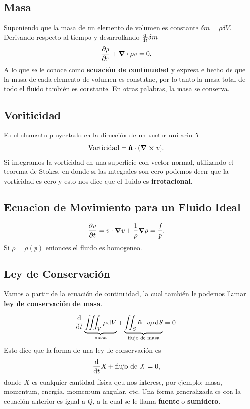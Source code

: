\subsection{Masa}
Suponiendo que la masa de un elemento de volumen es constante $\delta m = \rho \delta V$. Derivando respecto al tiempo y desarrollando $\dv{t} \delta m$
\begin{equation}
	\pdv{\rho}{r} + \div{\rho v} = 0,
\end{equation}
A lo que se le conoce como \textbf{ecuación de continuidad} y expresa e hecho de que la masa de cada elemento de volumen es constatne, por lo tanto la masa total de todo el fluido también es constante. En otras palabras, la masa se conserva.

\subsection{Voriticidad}
Es el elemento proyectado en la dirección de un vector unitario $\vu{n}$
\begin{equation}
	\text{Vorticidad} = \vu{n} \cdot \qty(\curl{v}).
\end{equation}
Si integramos la vorticidad en una superficie con vector normal, utilizando el teorema de Stokes, en donde si las integrales son cero podemos decir que la vorticidad es cero y esto nos dice que el fluido es \textbf{irrotacional}.

\subsection{Ecuacion de Movimiento para un Fluido Ideal}
\begin{equation}
	\pdv{v}{t} = v\cdot \grad{v} + \frac{1}{\rho} \grad{\rho} = \frac{f}{p}.
\end{equation}
Si $\rho = \rho (p)$ entonces el fluido es homogeneo.


\subsection{Ley de Conservación}
Vamos a partir de la ecuación de continuidad, la cual también le podemos llamar \textbf{ley de conservación de masa}. 

\begin{equation}
	\dv{t} \underbrace{\iiint _V \rho \dd{V}}_{\text{masa}} + \underbrace{\iint _S \vu{n} \cdot v \rho \dd{S}}_{\text{flujo de masa}} = 0.
\end{equation}
Esto dice que la forma de una ley de conservación es
\begin{equation}
	\dv{t} X + \text{flujo de } X = 0,
\end{equation}
donde $X$ es cualquier cantidad física qeu nos interese, por ejemplo: masa, momentum, energía, momentum angular, etc. Una forma generalizada es con la ecuación anterior es igual a $Q$, a la cual se le llama \textbf{fuente} o \textbf{sumidero}.\\

